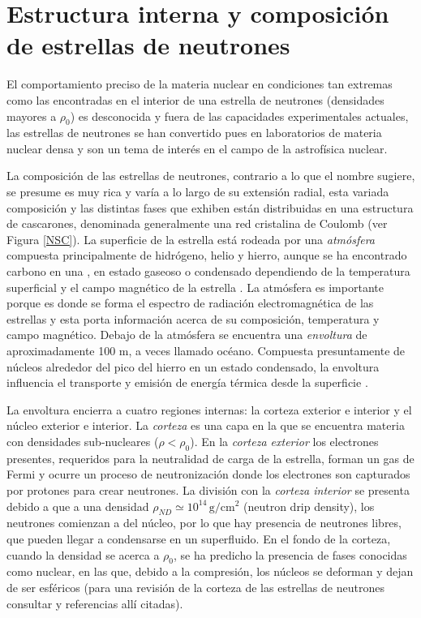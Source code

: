 \section{Estructura interna y composición de estrellas de neutrones}

El comportamiento preciso de la materia nuclear en condiciones tan extremas como las encontradas en el interior de una estrella de neutrones (densidades mayores a $\rho_0$) es desconocida y fuera de las capacidades experimentales actuales, las estrellas de neutrones se han convertido pues en laboratorios de materia nuclear densa y son un tema de interés en el campo de la astrofísica nuclear. 

La composición de las estrellas de neutrones, contrario a lo que el nombre sugiere, se presume es muy rica y varía a lo largo de su extensión radial, esta variada composición y las distintas fases que exhiben están distribuidas en una estructura de cascarones, denominada generalmente una red cristalina de Coulomb (ver Figura \ref{NSC}).
La superficie de la estrella está rodeada por una \emph{atmósfera} compuesta principalmente de hidrógeno, helio y hierro, aunque se ha encontrado carbono en una \cite{Ho2009ARemnant}, en estado gaseoso o condensado dependiendo de la temperatura superficial y el campo magnético de la estrella \cite{Zavlin2002ModelingAtmospheres}. La atmósfera es importante porque es donde se forma el espectro de radiación electromagnética de las estrellas y esta porta información acerca de su composición, temperatura y campo magnético. 
Debajo de la atmósfera se encuentra una \emph{envoltura} de aproximadamente 100 \si{\metre}, a veces llamado océano. Compuesta presuntamente de núcleos alrededor del pico del hierro en un estado condensado, la envoltura influencia el transporte y emisión de energía térmica desde la superficie \cite{Piekarewicz2013,Potekhin,Lattimer2004}.

La envoltura encierra a cuatro regiones internas: la corteza exterior e interior y el núcleo exterior e interior. La \emph{corteza} es una capa en la que se encuentra materia con densidades sub-nucleares ($\rho < \rho_0$). En la \emph{corteza exterior} los electrones presentes, requeridos para la neutralidad de carga de la estrella, forman un gas de Fermi y ocurre un proceso de neutronización donde los electrones son capturados por protones para crear neutrones. La división con la \emph{corteza interior} se presenta debido a que a una densidad $\rho_{ND}\simeq 10^{14}\, \si{\gram\per\centi\metre^2}$ (neutron drip density), los neutrones comienzan a  del núcleo, por lo que hay presencia de neutrones libres, que pueden llegar a condensarse en un superfluido. En el fondo de la corteza, cuando la densidad se acerca a $\rho_0$, se ha predicho la presencia de fases conocidas como  nuclear, en las que, debido a la compresión, los núcleos se deforman y dejan de ser esféricos (para una revisión de la corteza de las estrellas de neutrones consultar \cite{Chamel2008} y referencias allí citadas). 


